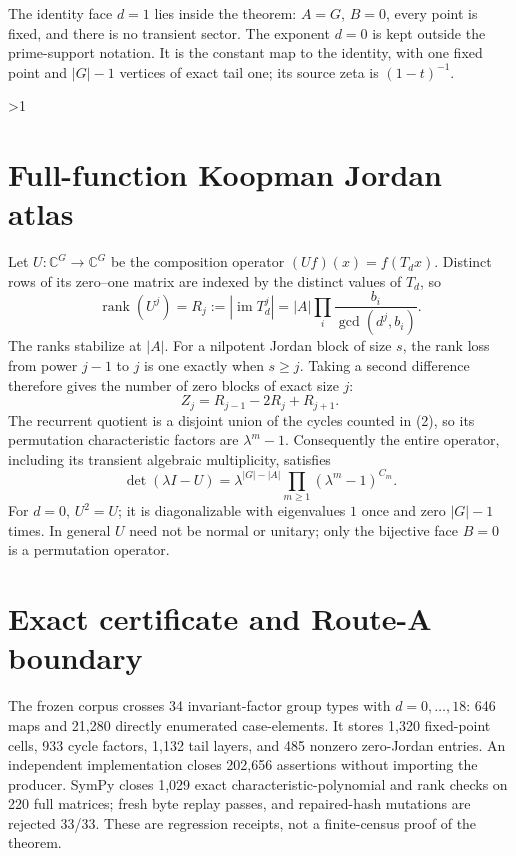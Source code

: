 \documentclass[10pt]{article}
\providecommand{\CRevisionRound}{2}
\newcommand{\rank}{\operatorname{rank}}
\begin{document}
The identity face $d=1$ lies inside the theorem: $A=G$, $B=0$, every point is
fixed, and there is no transient sector.  The exponent $d=0$ is kept outside
the prime-support notation.  It is the constant map to the identity, with one
fixed point and $|G|-1$ vertices of exact tail one; its source zeta is
$(1-t)^{-1}$.
\fi

\ifnum\CRevisionRound>1
\section{Full-function Koopman Jordan atlas}
Let $U:\mathbb C^G\to\mathbb C^G$ be the composition operator
$(Uf)(x)=f(T_d x)$.  Distinct rows of its zero--one matrix are indexed by the
distinct values of $T_d$, so
\begin{equation}
 \rank(U^j)=R_j:=|\operatorname{im}T_d^j|
 =|A|\prod_i\frac{b_i}{\gcd(d^j,b_i)}.                   \tag{6}
\end{equation}
The ranks stabilize at $|A|$.  For a nilpotent Jordan block of size $s$, the
rank loss from power $j-1$ to $j$ is one exactly when $s\geq j$.  Taking a
second difference therefore gives the number of zero blocks of exact size
$j$:
\begin{equation}
 Z_j=R_{j-1}-2R_j+R_{j+1}.                                \tag{7}
\end{equation}
The recurrent quotient is a disjoint union of the cycles counted in (2), so
its permutation characteristic factors are $\lambda^m-1$.  Consequently the
entire operator, including its transient algebraic multiplicity, satisfies
\begin{equation}
 \det(\lambda I-U)=\lambda^{|G|-|A|}
 \prod_{m\geq1}(\lambda^m-1)^{C_m}.                      \tag{8}
\end{equation}
For $d=0$, $U^2=U$; it is diagonalizable with eigenvalues $1$ once and zero
$|G|-1$ times.  In general $U$ need not be normal or unitary; only the
bijective face $B=0$ is a permutation operator.

\section{Exact certificate and Route-A boundary}
The frozen corpus crosses 34 invariant-factor group types with
$d=0,\ldots,18$: 646 maps and 21,280 directly enumerated case-elements.  It
stores 1,320 fixed-point cells, 933 cycle factors, 1,132 tail layers, and 485
nonzero zero-Jordan entries.  An independent implementation closes 202,656
assertions without importing the producer.  SymPy closes 1,029 exact
characteristic-polynomial and rank checks on 220 full matrices; fresh byte
replay passes, and repaired-hash mutations are rejected 33/33.  These are
regression receipts, not a finite-census proof of the theorem.
\end{document}
